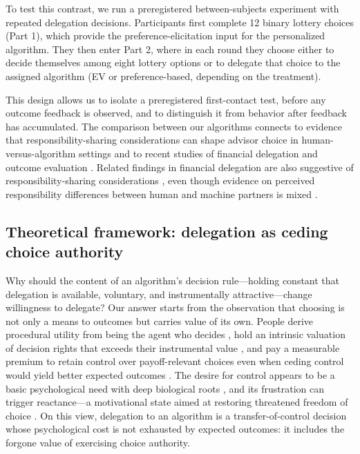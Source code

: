 \documentclass[a4paper, 12pt, fleqn]{article}
\theoremstyle{definition}
\newcommand{\inew}[1]{{\color{blue} #1\color{black}}}
\begin{document}
To test this contrast, we run a preregistered between-subjects experiment with repeated delegation decisions. Participants first complete 12 binary lottery choices (Part 1), which provide the preference-elicitation input for the personalized algorithm. They then enter Part 2, where in each round they choose either to decide themselves among eight lottery options or to delegate that choice to the assigned algorithm (EV or preference-based, depending on the treatment). 

This design allows us to isolate a preregistered first-contact test, before any outcome feedback is observed, and to distinguish it from behavior after feedback has accumulated. 
The comparison between our algorithms connects to evidence that responsibility-sharing considerations can shape advisor choice in human-versus-algorithm settings \citep{Gazit2023} and to recent studies of financial delegation and outcome evaluation \citep{Ismagilova2025}. Related findings in financial delegation are also suggestive of responsibility-sharing considerations \citep{Werner2026}, even though evidence on perceived responsibility differences between human and machine partners is mixed \citep{Kirchkamp2019}.

\inew{\subsection*{Theoretical framework: delegation as ceding choice authority}}
\inew{Why should the content of an algorithm's decision rule---holding constant that delegation is available, voluntary, and instrumentally attractive---change willingness to delegate? Our answer starts from the observation that choosing is not only a means to outcomes but carries value of its own. People derive procedural utility from being the agent who decides \citep{FreyBenzStutzer2004}, hold an intrinsic valuation of decision rights that exceeds their instrumental value \citep{Bartling2014}, and pay a measurable premium to retain control over payoff-relevant choices even when ceding control would yield better expected outcomes \citep{Owens2014}. The desire for control appears to be a basic psychological need with deep biological roots \citep{Leotti2010}, and its frustration can trigger reactance---a motivational state aimed at restoring threatened freedom of choice \citep{Brehm1966}. On this view, delegation to an algorithm is a transfer-of-control decision \citep{Candrian2022} whose psychological cost is not exhausted by expected outcomes: it includes the forgone value of exercising choice authority.}
\end{document}
